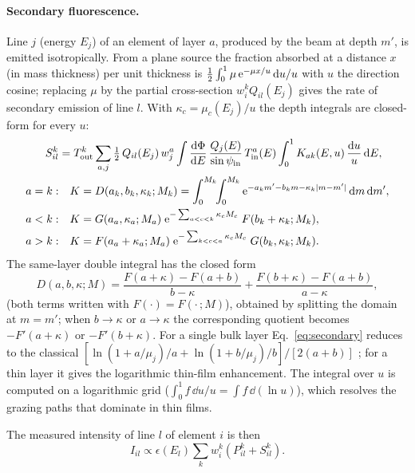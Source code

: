 \paragraph{Secondary fluorescence.} Line $j$ (energy $E_j$) of an element of layer $a$,
produced by the beam at depth $m'$, is emitted isotropically. From a plane source the
fraction absorbed at a distance $x$ (in mass thickness) per unit thickness is
$\frac12\int_0^1 \mu\,\mathrm{e}^{-\mu x/u}\,\mathrm{d} u/u$ with $u$ the direction cosine; replacing $\mu$
by the partial cross-section $w_i^k Q_{il}(E_j)$ gives the rate of secondary emission of line
$l$. With $\kappa_c = \mu_c(E_j)/u$ the depth integrals are closed-form for every $u$:
\begin{align}
  S_{il}^k &= T_\mathrm{out}^k \sum_{a,j} \tfrac12\,Q_{il}(E_j)\,w_j^a \int
  \frac{\mathrm{d}\Phi}{\mathrm{d} E}\,\frac{Q_j(E)}{\sin\psi_\mathrm{in}}\,T_\mathrm{in}^a(E)
  \int_0^1 K_{ak}(E,u)\,\frac{\mathrm{d} u}{u}\,\mathrm{d} E, \label{eq:secondary}\\
  a = k:&\quad K = D(a_k, b_k, \kappa_k; M_k) = \int_0^{M_k}\!\!\int_0^{M_k}
  \mathrm{e}^{-a_k m' - b_k m - \kappa_k|m-m'|}\,\mathrm{d} m\,\mathrm{d} m', \notag\\
  a < k:&\quad K = G(a_a,\kappa_a;M_a)\;\mathrm{e}^{-\sum_{a<c<k}\kappa_c M_c}\;F(b_k+\kappa_k;M_k),
  \notag\\
  a > k:&\quad K = F(a_a+\kappa_a;M_a)\;\mathrm{e}^{-\sum_{k<c<a}\kappa_c M_c}\;G(b_k,\kappa_k;M_k).
  \notag
\end{align}
The same-layer double integral has the closed form
\begin{equation}
  D(a,b,\kappa;M) = \frac{F(a+\kappa)-F(a+b)}{b-\kappa} + \frac{F(b+\kappa)-F(a+b)}{a-\kappa},
  \label{eq:D}
\end{equation}
(both terms written with $F(\cdot) = F(\cdot\,;M)$), obtained by splitting the domain at
$m=m'$; when $b\to\kappa$ or $a\to\kappa$ the corresponding quotient becomes $-F'(a+\kappa)$
or $-F'(b+\kappa)$. For a single bulk layer Eq.~\eqref{eq:secondary} reduces to the classical
$\left[\ln(1+a/\mu_j)/a + \ln(1+b/\mu_j)/b\right]/[2(a+b)]$ \citep{Shiraiwa1966}; for a thin
layer it gives the logarithmic thin-film enhancement. The integral over $u$ is computed on a
logarithmic grid ($\int_0^1 f\,\dd u/u = \int f\,\dd(\ln u)$), which resolves the grazing paths
that dominate in thin films.

The measured intensity of line $l$ of element $i$ is then
\begin{equation}
  I_{il} \propto \epsilon(E_l)\sum_k w_i^k\left(P_{il}^k + S_{il}^k\right).
\end{equation}


